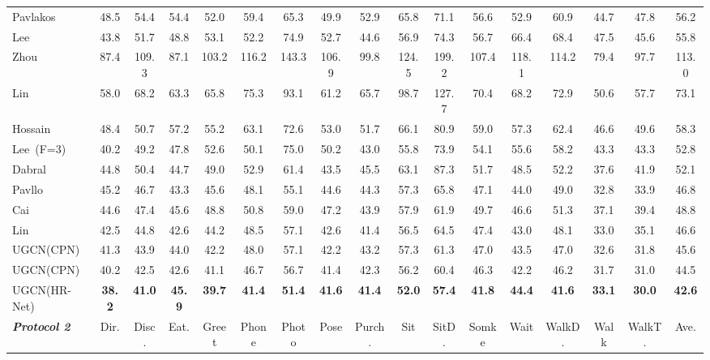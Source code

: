 \documentclass[runningheads]{llncs}
\begin{document}
\begin{table}[t]
\begin{tabular}[width=0.9\linewidth]{@{}l| ccccccccccccccc |c   @{}}
    Pavlakos~\cite{pavlakos2018ordinal} & 48.5& 54.4& 54.4& 52.0& 59.4& 65.3& 49.9& 52.9& 65.8& 71.1& 56.6& 52.9& 60.9& 44.7& 47.8& 56.2 \\
    Lee~\cite{lee2018propagating} & 43.8& 51.7& 48.8& 53.1& 52.2& 74.9& 52.7& 44.6& 56.9& 74.3& 56.7& 66.4& 68.4& 47.5& 45.6& 55.8 \\
    \midrule
    Zhou~\cite{zhou2016sparseness} & 87.4& 109.3& 87.1& 103.2& 116.2& 143.3& 106.9& 99.8& 124.5& 199.2& 107.4& 118.1& 114.2& 79.4& 97.7& 113.0 \\
    Lin~\cite{lin2017recurrent} & 58.0& 68.2& 63.3& 65.8& 75.3& 93.1& 61.2& 65.7& 98.7& 127.7& 70.4& 68.2& 72.9& 50.6& 57.7& 73.1 \\
    Hossain~\cite{rayat2018exploiting} & 48.4& 50.7& 57.2& 55.2& 63.1& 72.6& 53.0& 51.7& 66.1& 80.9& 59.0& 57.3& 62.4& 46.6& 49.6& 58.3 \\
    Lee~\cite{lee2018propagating}(F=3) & 40.2& 49.2& 47.8& 52.6& 50.1& 75.0& 50.2& 43.0& 55.8& 73.9& 54.1& 55.6& 58.2& 43.3& 43.3& 52.8 \\
    Dabral~\cite{dabral2018learning} & 44.8& 50.4& 44.7& 49.0& 52.9& 61.4& 43.5& 45.5& 63.1& 87.3& 51.7& 48.5& 52.2& 37.6& 41.9& 52.1 \\
    Pavllo~\cite{pavllo20193d} & 45.2& 46.7& 43.3& 45.6& 48.1& 55.1& 44.6& 44.3& 57.3& 65.8& 47.1& 44.0& 49.0& 32.8& 33.9& 46.8\\
    Cai~\cite{cai2019exploiting} & 44.6& 47.4& 45.6& 48.8& 50.8& 59.0& 47.2& 43.9& 57.9& 61.9& 49.7& 46.6& 51.3& 37.1& 39.4& 48.8 \\
    Lin~\cite{lin2019trajectory} & 42.5& 44.8& 42.6& 44.2& 48.5& 57.1& 42.6& 41.4& 56.5& 64.5& 47.4& 43.0& 48.1& 33.0& 35.1& 46.6 \\
    \midrule
    UGCN(CPN)& 41.3 & 43.9 & 44.0 & 42.2 & 48.0 & 57.1 & 42.2 & 43.2 & 57.3 & 61.3 & 47.0 & 43.5 & 47.0 & 32.6 & 31.8 & 45.6\\
    UGCN(CPN) & 40.2 & 42.5 & 42.6 & 41.1 & 46.7 & 56.7 & 41.4 & 42.3 & 56.2 & 60.4 & 46.3 & 42.2 & 46.2 & 31.7 & 31.0 & 44.5 \\
   	UGCN(HR-Net) & \textbf{38.2} & \textbf{41.0} & \textbf{45.9} & \textbf{39.7} & \textbf{41.4} &\textbf{51.4} & \textbf{41.6} & \textbf{41.4} & \textbf{52.0} & \textbf{57.4} & \textbf{41.8} & \textbf{44.4} & \textbf{41.6} & \textbf{33.1} & \textbf{30.0} & \textbf{42.6} \\
    \bottomrule
    \toprule
    \textbf{\emph{Protocol 2}} & Dir. & Disc. & Eat. & Greet   & Phone & Photo & Pose & Purch. & Sit   & SitD. & Somke & Wait & WalkD.  & Walk & WalkT. & Ave. \\

\end{tabular}
\end{table}
\end{document}
